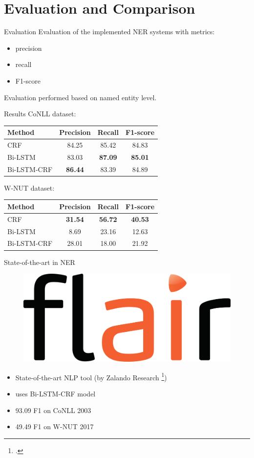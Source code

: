 \documentclass[12pt, tikz]{beamer}
\begin{document}
\section{Evaluation and Comparison}

\begin{frame}[fragile]{Evaluation}
	Evaluation of the implemented NER systems with metrics:
	\begin{itemize}
		\item precision
		\item recall
		\item F1-score
	\end{itemize}

	\pause
	
	Evaluation performed based on named entity level.
\end{frame}

\begin{frame}[fragile]{Results}
	CoNLL dataset:
	\begin{center}
		\begin{tabular}{| l | c | c | c |}
			\hline
			Method & Precision & Recall & F1-score \\ \hline
			CRF & 84.25 & 85.42 & 84.83 \\ \hline
			Bi-LSTM & 83.03 & \textbf{87.09} & \textbf{85.01} \\ \hline
			Bi-LSTM-CRF & \textbf{86.44} & 83.39 & 84.89 \\ \hline
		\end{tabular}
	\end{center}

	W-NUT dataset:
	\begin{center}
	\begin{tabular}{| l | c | c | c |}
		\hline
		Method & Precision & Recall & F1-score \\ \hline
		CRF & \textbf{31.54} & \textbf{56.72} & \textbf{40.53} \\ \hline
		Bi-LSTM & 8.69 & 23.16 & 12.63 \\ \hline
		Bi-LSTM-CRF & 28.01 & 18.00 & 21.92 \\ \hline
	\end{tabular}
\end{center}

\end{frame}

\begin{frame}[fragile]{State-of-the-art in NER}
	\begin{figure}
		\includegraphics[width=0.2\linewidth]{img/flair.png}
	\end{figure}
	\begin{itemize}
		\item<1-> State-of-the-art NLP tool (by Zalando Research \footcite{akbik2019flair})
		\item<2-> uses Bi-LSTM-CRF model
		\item<3-> 93.09 F1 on CoNLL 2003
		\item<4-> 49.49 F1 on W-NUT 2017
	\end{itemize}
\end{frame}
\end{document}
